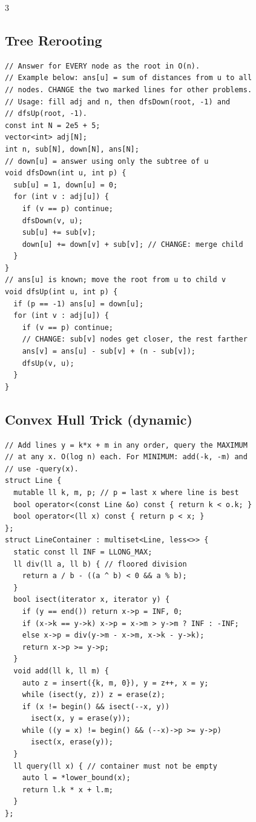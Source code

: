 \documentclass[8pt, a4paper]{article}
\begin{document}
\begin{multicols*}{3}
\subsection{Tree Rerooting}
\begin{lstlisting}
// Answer for EVERY node as the root in O(n).
// Example below: ans[u] = sum of distances from u to all
// nodes. CHANGE the two marked lines for other problems.
// Usage: fill adj and n, then dfsDown(root, -1) and
// dfsUp(root, -1).
const int N = 2e5 + 5;
vector<int> adj[N];
int n, sub[N], down[N], ans[N];
// down[u] = answer using only the subtree of u
void dfsDown(int u, int p) {
  sub[u] = 1, down[u] = 0;
  for (int v : adj[u]) {
    if (v == p) continue;
    dfsDown(v, u);
    sub[u] += sub[v];
    down[u] += down[v] + sub[v]; // CHANGE: merge child
  }
}
// ans[u] is known; move the root from u to child v
void dfsUp(int u, int p) {
  if (p == -1) ans[u] = down[u];
  for (int v : adj[u]) {
    if (v == p) continue;
    // CHANGE: sub[v] nodes get closer, the rest farther
    ans[v] = ans[u] - sub[v] + (n - sub[v]);
    dfsUp(v, u);
  }
}
\end{lstlisting}
\subsection{Convex Hull Trick (dynamic)}
\begin{lstlisting}
// Add lines y = k*x + m in any order, query the MAXIMUM
// at any x. O(log n) each. For MINIMUM: add(-k, -m) and
// use -query(x).
struct Line {
  mutable ll k, m, p; // p = last x where line is best
  bool operator<(const Line &o) const { return k < o.k; }
  bool operator<(ll x) const { return p < x; }
};
struct LineContainer : multiset<Line, less<>> {
  static const ll INF = LLONG_MAX;
  ll div(ll a, ll b) { // floored division
    return a / b - ((a ^ b) < 0 && a % b);
  }
  bool isect(iterator x, iterator y) {
    if (y == end()) return x->p = INF, 0;
    if (x->k == y->k) x->p = x->m > y->m ? INF : -INF;
    else x->p = div(y->m - x->m, x->k - y->k);
    return x->p >= y->p;
  }
  void add(ll k, ll m) {
    auto z = insert({k, m, 0}), y = z++, x = y;
    while (isect(y, z)) z = erase(z);
    if (x != begin() && isect(--x, y))
      isect(x, y = erase(y));
    while ((y = x) != begin() && (--x)->p >= y->p)
      isect(x, erase(y));
  }
  ll query(ll x) { // container must not be empty
    auto l = *lower_bound(x);
    return l.k * x + l.m;
  }
};
\end{lstlisting}

\end{multicols*}
\end{document}
